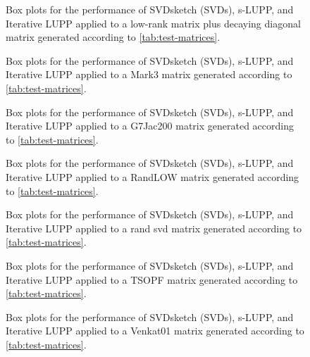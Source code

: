 \begin{figure}[H]
    \centering
    
    \caption{Box plots for the performance of  SVDsketch (SVDs), s-LUPP, and Iterative LUPP applied to a low-rank matrix plus decaying diagonal matrix generated according to  \cref{tab:test-matrices}.}
    \label{fig:low_rank_pd_comp}
\end{figure}
\begin{figure}[H]
    \centering
    
    \caption{Box plots for the performance of  SVDsketch (SVDs), s-LUPP, and Iterative LUPP applied to a Mark3 matrix generated according to \cref{tab:test-matrices}.}
    \label{fig:mark3}
\end{figure}
\begin{figure}[H]
   \centering
   
   \caption{Box plots for the performance of  SVDsketch (SVDs), s-LUPP, and Iterative LUPP applied to a G7Jac200 matrix generated according to \cref{tab:test-matrices}.}
   \label{fig:g7jac}
\end{figure}
\begin{figure}[H]
    \centering
    
    \caption{Box plots for the performance of  SVDsketch (SVDs), s-LUPP, and Iterative LUPP applied to a RandLOW matrix generated according to \cref{tab:test-matrices}.}
    \label{fig:randLOW}
\end{figure}
\begin{figure}[H]
    \centering
    
    \caption{Box plots for the performance of  SVDsketch (SVDs), s-LUPP, and Iterative LUPP applied to a rand svd matrix generated according to  \cref{tab:test-matrices}.}
    \label{fig:rand_svd_comp}
\end{figure}
\begin{figure}[H]
    \centering
    
    \caption{Box plots for the performance of  SVDsketch (SVDs), s-LUPP, and Iterative LUPP applied to a TSOPF matrix generated according to \cref{tab:test-matrices}.}
    \label{fig:tsopf}
\end{figure}
\begin{figure}[H]
    \centering
    
    \caption{Box plots for the performance of  SVDsketch (SVDs), s-LUPP, and Iterative LUPP applied to a Venkat01 matrix generated according to \cref{tab:test-matrices}.}
    \label{fig:venkat01}
\end{figure}

